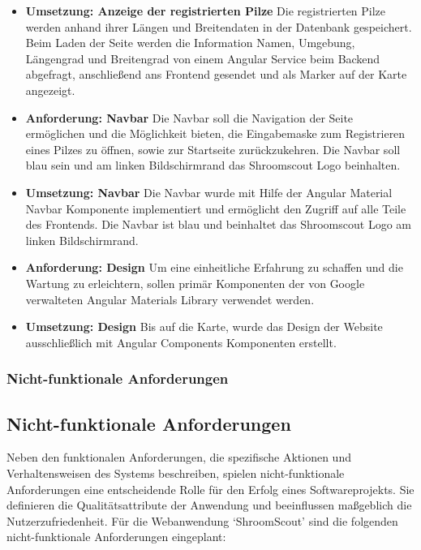 \documentclass[../main.tex]{subfiles}
\begin{document}
\begin{itemize}
	\item \textbf{Umsetzung: Anzeige der registrierten Pilze}
		  Die registrierten Pilze werden anhand ihrer Längen und Breitendaten in der Datenbank gespeichert.
          Beim Laden der Seite werden die Information Namen, Umgebung, Längengrad und Breitengrad von einem Angular Service beim Backend abgefragt, anschließend ans Frontend gesendet
          und als Marker auf der Karte angezeigt.

	\item \textbf{Anforderung: Navbar}
	      Die Navbar soll die Navigation der Seite ermöglichen und die Möglichkeit bieten, die Eingabemaske zum Registrieren eines Pilzes zu öffnen, sowie zur Startseite zurückzukehren.
		  Die Navbar soll blau sein und am linken Bildschirmrand das Shroomscout Logo beinhalten.

    \item \textbf{Umsetzung: Navbar}
	      Die Navbar wurde mit Hilfe der Angular Material Navbar Komponente implementiert und ermöglicht den Zugriff auf alle Teile des Frontends.
          Die Navbar ist blau und beinhaltet das Shroomscout Logo am linken Bildschirmrand.

	\item \textbf{Anforderung: Design}
	      Um eine einheitliche Erfahrung zu schaffen und die Wartung zu erleichtern, sollen primär Komponenten der von Google verwalteten Angular Materials Library verwendet werden.

    \item \textbf{Umsetzung: Design}
          Bis auf die Karte, wurde das Design der Website ausschließlich mit Angular Components Komponenten erstellt.
\end{itemize}

\subsubsection{Nicht-funktionale Anforderungen}

\subsection{Nicht-funktionale Anforderungen}

Neben den funktionalen Anforderungen, die spezifische Aktionen und Verhaltensweisen des Systems beschreiben, spielen
nicht-funktionale Anforderungen eine entscheidende Rolle für den Erfolg eines Softwareprojekts. Sie definieren die
Qualitätsattribute der Anwendung und beeinflussen maßgeblich die Nutzerzufriedenheit. Für die Webanwendung `ShroomScout'
sind die folgenden nicht-funktionale Anforderungen eingeplant:
\end{document}
